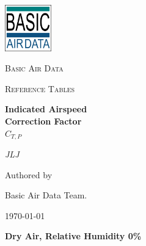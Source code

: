 \documentclass[12pt,a4paper,twoside]{article}
\author{JLJ}
\begin{document}
\begin{titlepage}
	\centering
	\includegraphics[width=0.15\textwidth]{icon.png}\par\vspace{1cm}
	{\scshape\LARGE Basic Air Data \par}
	\vspace{1cm}
	{\scshape\Large Reference Tables\par}
	\vspace{1cm}
	{\huge\bfseries Indicated Airspeed \\Correction Factor\\\(C_{T,P}\)\par}
	\vspace{2cm}
	{\Large\itshape JLJ\par}
	\vfill
	Authored by\par
	Basic Air Data Team.
	{\large \today\par}
\end{titlepage}
\textbf{Dry Air, Relative Humidity 0\%}
\end{document}
